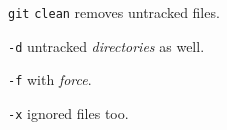 %

\begin{compactenum}
\item [\texttt{git}] \texttt{clean} removes untracked files.
\item [\texttt{-d}] untracked \emph{directories} as well.
\item [\texttt{-f}] with \emph{force}.
\item [\texttt{-x}] ignored files too.
\end{compactenum}

%